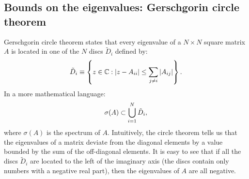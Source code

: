 \documentclass[12pt, titlepage]{report}
\begin{document}
\subsection{Bounds on the eigenvalues: Gerschgorin circle theorem}\label{sec : gerschgorin circle theorem}
Gerschgorin circle theorem \cite{gerschgorin_uber_1931}
states that every eigenvalue of a $N\times N$ square matrix $A$
is located in one of the $N$ discs $\tilde{D}_i$ defined by:
\begin{equation}
\tilde{D}_i\equiv \left\{z \in \mathbb{C}: \left|{z-A_{ii}}\right| \leq \sum_{j\neq i} \left|{A_{ij}}\right| \right\}. \label{eq: definition discs Gerschgorin}
\end{equation}
In a more mathematical language:
\begin{equation}
\sigma(A) \subset \bigcup_{i=1}^N \tilde{D}_i, \label{eq: circle theorem}
\end{equation}
where $\sigma(A)$ is the spectrum of $A$. Intuitively, the circle theorem tells us that the eigenvalues of a matrix deviate from the diagonal elements by a value bounded by the sum of the off-diagonal elements.
It is easy to see that if all the discs $\tilde{D}_i$ are located to the left of the imaginary axis (\ie the discs contain only numbers with a negative real part), then the eigenvalues of $A$ are all negative.
\end{document}
